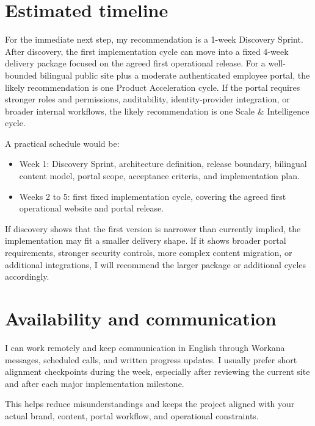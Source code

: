 \documentclass[11pt,a4paper]{article}
\begin{document}
\section*{Estimated timeline}

For the immediate next step, my recommendation is a 1-week Discovery Sprint. After discovery, the first implementation cycle can move into a fixed 4-week delivery package focused on the agreed first operational release. For a well-bounded bilingual public site plus a moderate authenticated employee portal, the likely recommendation is one Product Acceleration cycle. If the portal requires stronger roles and permissions, auditability, identity-provider integration, or broader internal workflows, the likely recommendation is one Scale \& Intelligence cycle.\par

A practical schedule would be:\par

\begin{itemize}
\item Week 1: Discovery Sprint, architecture definition, release boundary, bilingual content model, portal scope, acceptance criteria, and implementation plan.
\item Weeks 2 to 5: first fixed implementation cycle, covering the agreed first operational website and portal release.
\end{itemize}

If discovery shows that the first version is narrower than currently implied, the implementation may fit a smaller delivery shape. If it shows broader portal requirements, stronger security controls, more complex content migration, or additional integrations, I will recommend the larger package or additional cycles accordingly.\par

\section*{Availability and communication}

I can work remotely and keep communication in English through Workana messages, scheduled calls, and written progress updates. I usually prefer short alignment checkpoints during the week, especially after reviewing the current site and after each major implementation milestone.\par

This helps reduce misunderstandings and keeps the project aligned with your actual brand, content, portal workflow, and operational constraints.\par
\end{document}
